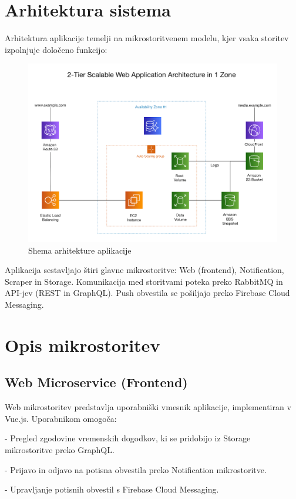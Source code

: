 \documentclass[a4paper,11pt]{article}
\begin{document}
\section*{Arhitektura sistema}
Arhitektura aplikacije temelji na mikrostoritvenem modelu, kjer vsaka storitev izpolnjuje dolo\v{c}eno funkcijo:
\begin{figure}[h!]
    \centering
    \includegraphics[width=\textwidth]{architecture_diagram.png}
    \caption{Shema arhitekture aplikacije}
\end{figure}

Aplikacija sestavljajo \v{s}tiri glavne mikrostoritve: Web (frontend), Notification, Scraper in Storage. Komunikacija med storitvami poteka preko RabbitMQ in API-jev (REST in GraphQL). Push obvestila se po\v{s}iljajo preko Firebase Cloud Messaging.

\section*{Opis mikrostoritev}
\subsection*{Web Microservice (Frontend)}
Web mikrostoritev predstavlja uporabni\v{s}ki vmesnik aplikacije, implementiran v Vue.js. Uporabnikom omogo\v{c}a:

- Pregled zgodovine vremenskih dogodkov, ki se pridobijo iz Storage mikrostoritve preko GraphQL.

- Prijavo in odjavo na potisna obvestila preko Notification mikrostoritve.

- Upravljanje potisnih obvestil s Firebase Cloud Messaging.
\end{document}
